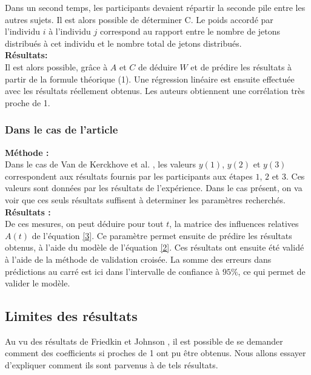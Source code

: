 \documentclass{scrreprt}
\begin{document}
\begin{multicols}{2}
Dans un second temps, les participants devaient répartir la seconde pile entre les autres sujets. Il est alors possible de déterminer C. Le poids accordé par l'individu $i$ à l'individu $j$ correspond au rapport entre le nombre de jetons distribués à cet individu et le nombre total de jetons distribués.\\

\textbf{Résultats:}\\

Il est alors possible, grâce à $A$ et $C$ de déduire $W$ et de prédire les résultats à partir de la formule théorique (1). Une régression linéaire est ensuite effectuée avec les résultats réellement obtenus. Les auteurs obtiennent une corrélation très proche de 1.
 
\subsubsection{Dans le cas de l'article \cite{VMG}}

\textbf{Méthode :} \\

Dans le cas de Van de Kerckhove et al. \cite{VMG}, les valeurs $y(1)$, $y(2)$ et $y(3)$ correspondent aux résultats fournis par les participants aux étapes $1$, $2$ et $3$. Ces valeurs sont données par les résultats de l'expérience. Dans le cas présent, on va voir que ces seuls résultats suffisent à determiner les paramètres recherchés.\\

\textbf{Résultats :} \\

De ces mesures, on peut déduire pour tout $t$, la matrice des influences relatives $A(t)$ de l'équation \eqref{3}. Ce paramètre permet ensuite de prédire les résultats obtenus, à l'aide du modèle de l'équation \eqref{2}. Ces résultats ont ensuite été validé à l'aide de la méthode de validation croisée. La somme des erreurs dans prédictions au carré est ici dans l'intervalle de confiance à $95\%$, ce qui permet de valider le modèle.\\

\subsection{Limites des résultats}

Au vu des résultats de Friedkin et Johnson \cite{FJ}, il est possible de se demander comment des coefficients si proches de 1 ont pu être obtenus. Nous allons essayer d'expliquer comment ils sont parvenus à de tels résultats.\\


\end{multicols}
\end{document}
